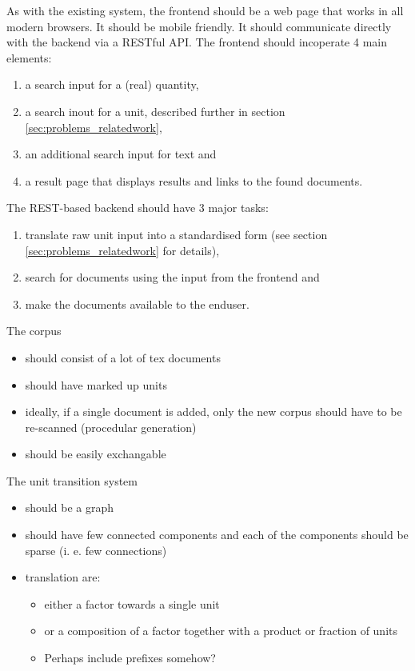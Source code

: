 \documentclass[11pt]{article}
\begin{document}
As with the existing system, the frontend should be a web page that works in all modern browsers. It should be mobile friendly. It should communicate directly with the backend via a RESTful API. The frontend should incoperate 4 main elements:

\begin{enumerate}
  \item a search input for a (real) quantity,
  \item a search inout for a unit, described further in section \ref{sec:problems_relatedwork},
  \item an additional search input for text and
  \item a result page that displays results and links to the found documents.
\end{enumerate}

\noindent The REST-based backend should have 3 major tasks:

\begin{enumerate}
  \item translate raw unit input into a standardised form (see section \ref{sec:problems_relatedwork} for details),
  \item search for documents using the input from the frontend and
  \item make the documents available to the enduser.
\end{enumerate}

\noindent The corpus 
\begin{itemize}
  \item should consist of a lot of tex documents
  \item should have marked up units
  \item ideally, if a single document is added, only the new corpus should have to be re-scanned (procedular generation)
  \item should be easily exchangable
\end{itemize}

The unit transition system
\begin{itemize}
  \item should be a graph
  \item should have few connected components and each of the components should be sparse (i. e. few connections)
  \item translation are:
  \begin{itemize}
    \item either a factor towards a single unit
    \item or a composition of a factor together with a product or fraction of units 
    \item Perhaps include prefixes somehow?
  \end{itemize}
\end{itemize}
\end{document}
